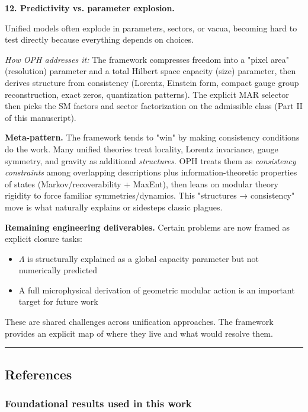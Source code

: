 \textbf{12. Predictivity vs. parameter explosion.}

Unified models often explode in parameters, sectors, or vacua, becoming hard to test directly because everything depends on choices.

\emph{How OPH addresses it:} The framework compresses freedom into a "pixel area" (resolution) parameter and a total Hilbert space capacity (size) parameter, then derives structure from consistency (Lorentz, Einstein form, compact gauge group reconstruction, exact zeros, quantization patterns). The explicit MAR selector then picks the SM factors and sector factorization on the admissible class (Part II of this manuscript).

\textbf{Meta-pattern.} The framework tends to "win" by making consistency conditions do the work. Many unified theories treat locality, Lorentz invariance, gauge symmetry, and gravity as additional \emph{structures}. OPH treats them as \emph{consistency constraints} among overlapping descriptions plus information-theoretic properties of states (Markov/recoverability + MaxEnt), then leans on modular theory rigidity to force familiar symmetries/dynamics. This "structures → consistency" move is what naturally explains or sidesteps classic plagues.

\textbf{Remaining engineering deliverables.} Certain problems are now framed as explicit closure tasks:

\begin{itemize}
\tightlist
\item
  \(\Lambda\) is structurally explained as a global capacity parameter but not numerically predicted
\item
  A full microphysical derivation of geometric modular action is an important target for future work
\end{itemize}

These are shared challenges across unification approaches. The framework provides an explicit map of where they live and what would resolve them.

\begin{center}\rule{0.5\linewidth}{0.5pt}\end{center}

\subsection{References}\label{references}

\subsubsection{Foundational results used in this work}\label{foundational-results-used-in-this-work}

